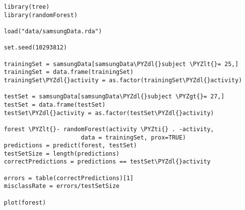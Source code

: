 \begin{Verbatim}[commandchars=\\\{\}]
library(tree)
library(randomForest)

load("data/samsungData.rda")

set.seed(10293812)

trainingSet = samsungData[samsungData\PYZdl{}subject \PYZlt{}= 25,] 
trainingSet = data.frame(trainingSet)
trainingSet\PYZdl{}activity = as.factor(trainingSet\PYZdl{}activity)

testSet = samsungData[samsungData\PYZdl{}subject \PYZgt{}= 27,]
testSet = data.frame(testSet)
testSet\PYZdl{}activity = as.factor(testSet\PYZdl{}activity)

forest \PYZlt{}- randomForest(activity \PYZti{} . -activity, 
                      data = trainingSet, prox=TRUE)
predictions = predict(forest, testSet)
testSetSize = length(predictions)
correctPredictions = predictions == testSet\PYZdl{}activity

errors = table(correctPredictions)[1]
misclassRate = errors/testSetSize

plot(forest)
\end{Verbatim}
